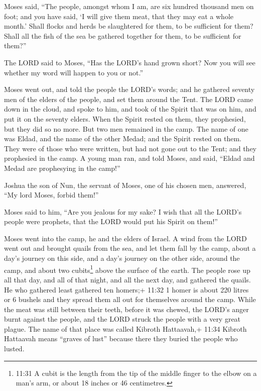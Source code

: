  Moses said, ``The people, amongst whom I am, are six
hundred thousand men on foot; and you have said, `I will give them meat,
that they may eat a whole month.'  Shall flocks and herds
be slaughtered for them, to be sufficient for them? Shall all the fish
of the sea be gathered together for them, to be sufficient for them?''

 The LORD said to Moses, ``Has the LORD's hand grown short?
Now you will see whether my word will happen to you or not.''

 Moses went out, and told the people the LORD's words; and
he gathered seventy men of the elders of the people, and set them around
the Tent.  The LORD came down in the cloud, and spoke to
him, and took of the Spirit that was on him, and put it on the seventy
elders. When the Spirit rested on them, they prophesied, but they did so
no more.  But two men remained in the camp. The name of one
was Eldad, and the name of the other Medad; and the Spirit rested on
them. They were of those who were written, but had not gone out to the
Tent; and they prophesied in the camp.  A young man ran,
and told Moses, and said, ``Eldad and Medad are prophesying in the
camp!''

 Joshua the son of Nun, the servant of Moses, one of his
chosen men, answered, ``My lord Moses, forbid them!''

 Moses said to him, ``Are you jealous for my sake? I wish
that all the LORD's people were prophets, that the LORD would put his
Spirit on them!''

 Moses went into the camp, he and the elders of Israel.
 A wind from the LORD went out and brought quails from the
sea, and let them fall by the camp, about a day's journey on this side,
and a day's journey on the other side, around the camp, and about two
cubits\footnote{11:31 A cubit is the length from the tip of the middle
  finger to the elbow on a man's arm, or about 18 inches or 46
  centimetres.} above the surface of the earth.  The people
rose up all that day, and all of that night, and all the next day, and
gathered the quails. He who gathered least gathered ten homers;+ 11:32 1
homer is about 220 litres or 6 bushels and they spread them all out for
themselves around the camp.  While the meat was still
between their teeth, before it was chewed, the LORD's anger burnt
against the people, and the LORD struck the people with a very great
plague.  The name of that place was called Kibroth
Hattaavah,+ 11:34 Kibroth Hattaavah means ``graves of lust'' because
there they buried the people who lusted.

